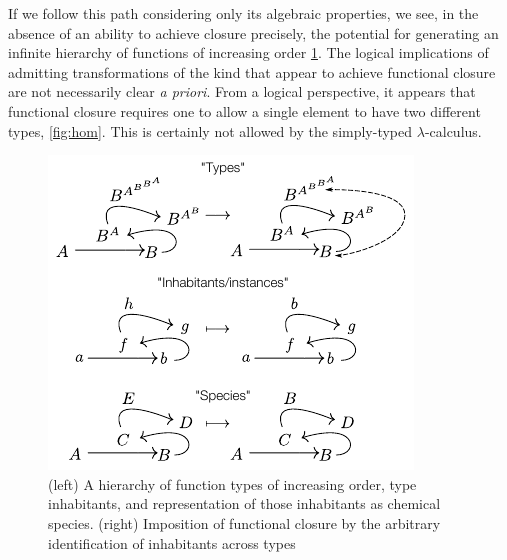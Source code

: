 \documentclass[10pt]{article}
\theoremstyle{plain}
\theoremstyle{definition}
\theoremstyle{remark}
\begin{document}
If we follow this path considering only its algebraic properties, we see, in the absence of an ability to achieve closure precisely, the potential for generating an infinite hierarchy of functions of increasing order \ref{fig:speciesclosure}. The logical implications of admitting transformations of the kind that appear to achieve functional closure are not necessarily clear \emph{a priori}. From a logical perspective, it appears that functional closure requires one to allow a single element to have two different types, \ref{fig:hom}. This is certainly not allowed by the simply-typed $\lambda$-calculus.

\begin{figure}[!htbp]
\centering
\noindent\includegraphics[width=0.5\columnwidth]{fig/speciesclosure.pdf}
\caption[Relationship of types, inhabitants, and species of reaction networks]{(left) A hierarchy of function types of increasing order, type inhabitants, and representation of those inhabitants as chemical species. (right) Imposition of functional closure by the arbitrary identification of inhabitants across types}
\label{fig:speciesclosure}
\end{figure}
\end{document}
